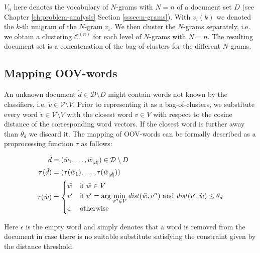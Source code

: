 $V_n$ here denotes the vocabulary of $N$-grams with $N=n$ of a document set
$D$ (see Chapter \ref{ch:problem-analysis} Section \ref{sssec:n-grams}). With
$v_i(k)$ we denoted the $k$-th unigram of the $N$-gram $v_i$.
We then cluster the $N$-grams separately, i.e. we obtain a clustering
$\mathcal{C}^{(n)}$ for each level of $N$-grams with $N=n$. The resulting
document set is a concatenation of the bag-of-clusters for the different $N$-grams.

\subsection{Mapping OOV-words}

An unknown document $\tilde{d} \in \mathcal{D}\setminus D$ might contain words not
known by the classifiers, i.e. $\tilde{v} \in \mathcal{V}\setminus V$. Prior to
representing it as a bag-of-clusters, we substitute every word $\tilde{v} \in
\mathcal{V} \setminus V$ with the closest word $v \in V$ with respect to the
cosine distance of the corresponding word vectors. If the closest word is
further away than $\theta_d$ we discard it. The mapping of OOV-words can be
formally described as a proprocessing function $\tau$ as follows:

\begin{equation*}
\begin{split}
	\tilde{d} &= (\tilde{w}_1, \ldots, \tilde{w}_{|\tilde{d}|}) \in
	\mathcal{D}\setminus D \\	
	\boldsymbol\tau(\tilde{d}) &= (\tau(\tilde{w}_1), \ldots,
	\tau(\tilde{w}_{|\tilde{d}|})) \\	
	\tau(\tilde{w}) &= \begin{cases} \tilde{w} & \text{if~} \tilde{w} \in V \\ v' &
	\text{if~} v' = \arg\min\limits_{v''\in V}\mathit{dist}(\tilde{w},v'') 
	\text{~and~} \mathit{dist}(v',\tilde{w}) \leq \theta_d \\ \epsilon
	& \text{otherwise}
	\end{cases}	
\end{split} 
\end{equation*}

Here $\epsilon$ is the empty word and simply denotes that a word is removed
from the document in case there is no suitable substitute satisfying the
constraint given by the distance threshold.
